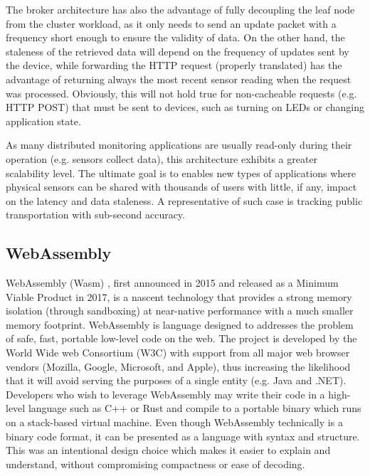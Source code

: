\documentclass{ieeeaccess}
\begin{document}
The broker architecture has also the advantage of fully decoupling the leaf node from the cluster workload, as it only needs to send an update packet with a frequency short enough to ensure the validity of data. On the other hand, the staleness of the retrieved data will depend on the frequency of updates sent by the device, while forwarding the HTTP request (properly translated) has the advantage of returning always the most recent sensor reading when the request was processed. Obviously, this will not hold true for non-cacheable requests (e.g. HTTP POST) that must be sent to devices, such as turning on LEDs or changing application state. 

As many distributed monitoring applications are usually read-only during their operation (e.g. sensors collect data), this architecture exhibits a greater scalability level. The ultimate goal is to enables new types of applications where physical sensors can be shared with thousands of users with little, if any, impact on the latency and data staleness. A representative of such case is tracking public transportation with sub-second accuracy.

\subsection{WebAssembly}
\label{sec:webassembly}

WebAssembly (Wasm) \cite{wasm}, first announced in 2015 and released as a Minimum Viable Product in 2017, is a nascent technology that provides a strong memory isolation (through sandboxing) at near-native performance with a much smaller memory footprint. WebAssembly is language designed to addresses the problem of safe, fast, portable low-level code on the web. The project is developed by the World Wide web Consortium (W3C) with support from all major web browser vendors (Mozilla, Google, Microsoft, and Apple), thus increasing the likelihood that it will avoid serving the purposes of a single entity (e.g. Java and .NET). Developers who wish to leverage WebAssembly may write their code in a high-level language such as C++ or Rust and compile to a portable binary which runs on a stack-based virtual machine. Even though WebAssembly technically is a binary code format, it can be presented as a language with syntax and structure. This was an intentional design choice which makes it easier to explain and understand, without compromising compactness or ease of decoding.
\end{document}
